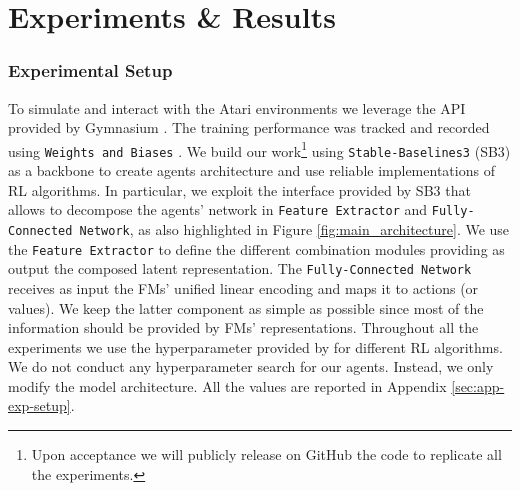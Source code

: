 
\chapter{Experiments \& Results}
\label{sec:experiments}

\subsection{Experimental Setup}\label{sec:exp-setup}
To simulate and interact with the Atari environments \citep{bellemare2013atari} we leverage the API provided by Gymnasium \citep{towers_gymnasium_2023}. The training performance was tracked and recorded using \texttt{Weights and Biases} \citep{wandb}. We build our work\footnote{Upon acceptance we will publicly release on GitHub the code to replicate all the experiments.} using \texttt{Stable-Baselines3} (SB3) \citep{stable-baselines3} as a backbone to create agents architecture and use reliable implementations of RL algorithms. In particular, we exploit the interface provided by SB3 that allows to decompose the agents' network in \texttt{Feature Extractor} and \texttt{Fully-Connected Network}, as also highlighted in Figure \ref{fig:main_architecture}. We use the \texttt{Feature Extractor} to define the different combination modules providing as output the composed latent representation. The \texttt{Fully-Connected Network} receives as input the FMs' unified linear encoding and maps it to actions (or values). We keep the latter component as simple as possible since most of the information should be provided by FMs' representations. Throughout all the experiments we use the hyperparameter provided by \citet{rl-zoo3} for different RL algorithms. We do not conduct any hyperparameter search for our agents. Instead, we only modify the model architecture. All the values are reported in Appendix \ref{sec:app-exp-setup}.

